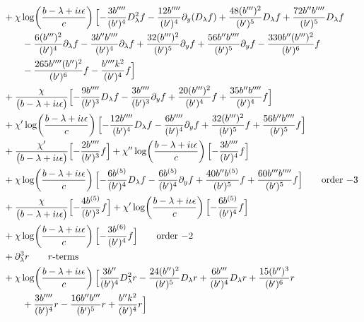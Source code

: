 \documentclass[reqno,11pt]{amsart}
\numberwithin{equation}{section}
\newcommand{\p}{\partial}
\newcommand{\D}{D_\lambda}
\numberwithin{equation}{section} %
\begin{document}
\begin{enumerate}
\begin{align}
&+\chi\log\!\left(\frac{b -\lambda+i\iota\epsilon}{c}\right)\Bigl[- \frac{3 b'''' }{(b' )^{4}} \D^2 f- \frac{12 b'''' }{(b' )^{4}} \p_y(\D f)+\frac{48 (b''' )^{2}}{(b' )^{5}} \D f+\frac{72 b''  b'''' }{(b' )^{5}} \D f\notag\\
&\qquad - \frac{6 (b''' )^{2}}{(b' )^{4}} \p_\lambda f- \frac{3 b''  b'''' }{(b' )^{4}} \p_\lambda f+\frac{32 (b''' )^{2}}{(b' )^{5}} \p_y f+\frac{56 b''  b'''' }{(b' )^{5}} \p_y f- \frac{330 b''  (b''' )^{2}}{(b' )^{6}} f\notag\\
&\qquad - \frac{265 b''''  (b'' )^{2}}{(b' )^{6}} f- \frac{b''''  k^2}{(b' )^{4}} f\Bigr]\notag\\
&+\frac{\chi}{\bigl(b -\lambda+i\iota\epsilon\bigr)}\Bigl[- \frac{9 b'''' }{(b' )^{3}} \D f- \frac{3 b'''' }{(b' )^{3}} \p_y f+\frac{20 (b''' )^{2}}{(b' )^{4}} f+\frac{35 b''  b'''' }{(b' )^{4}} f\Bigr]\notag\\
&+\chi'\log\!\left(\frac{b -\lambda+i\iota\epsilon}{c}\right)\Bigl[- \frac{12 b'''' }{(b' )^{4}} \D f- \frac{6 b'''' }{(b' )^{4}} \p_y f+\frac{32 (b''' )^{2}}{(b' )^{5}} f+\frac{56 b''  b'''' }{(b' )^{5}} f\Bigr]\notag\\
&+\frac{\chi'}{\bigl(b -\lambda+i\iota\epsilon\bigr)}\Bigl[- \frac{2 b'''' }{(b' )^{3}} f\Bigr]+\chi''\log\!\left(\frac{b -\lambda+i\iota\epsilon}{c}\right)\Bigl[- \frac{3 b'''' }{(b' )^{4}} f\Bigr]\notag\\
&+\chi\log\!\left(\frac{b -\lambda+i\iota\epsilon}{c}\right)\Bigl[- \frac{6 b^{(5)} }{(b' )^{4}} \D f- \frac{6 b^{(5)} }{(b' )^{4}} \p_y f+\frac{40 b''  b^{(5)} }{(b' )^{5}} f+\frac{60 b'''  b'''' }{(b' )^{5}} f\Bigr]\tag*{\text{order $-3$}}\\
&+\frac{\chi}{\bigl(b -\lambda+i\iota\epsilon\bigr)}\Bigl[- \frac{4 b^{(5)} }{(b' )^{3}} f\Bigr]+\chi'\log\!\left(\frac{b -\lambda+i\iota\epsilon}{c}\right)\Bigl[- \frac{6 b^{(5)} }{(b' )^{4}} f\Bigr]\notag\\
&+\chi\log\!\left(\frac{b -\lambda+i\iota\epsilon}{c}\right)\Bigl[- \frac{3 b^{(6)} }{(b' )^{4}} f\Bigr]\tag*{\text{order $-2$}}\\
&+\p_\lambda^3 r\tag*{\text{$r$-terms}}\\
&+\chi\log\!\left(\frac{b -\lambda+i\iota\epsilon}{c}\right)\Bigl[\frac{3 b'' }{(b' )^{4}} \D^2 r- \frac{24 (b'' )^{2}}{(b' )^{5}} \D r+\frac{6 b''' }{(b' )^{4}} \D r+\frac{15 (b'' )^{3}}{(b' )^{6}} r\notag\\
&\qquad +\frac{3 b'''' }{(b' )^{4}} r- \frac{16 b''  b''' }{(b' )^{5}} r+\frac{b''  k^2}{(b' )^{4}} r\Bigr]\notag\\

\end{align}
\end{enumerate}
\end{document}
